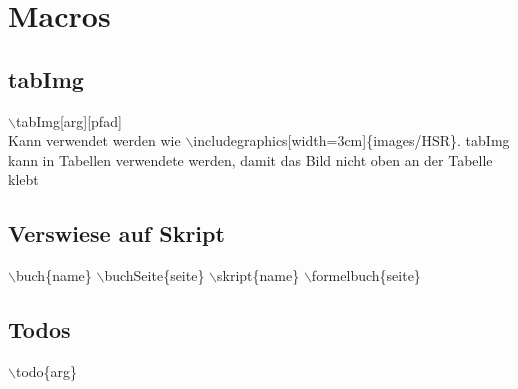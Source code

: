 \section*{Macros}
\subsection{tabImg}
$\backslash$tabImg[arg][pfad]\\
Kann verwendet werden wie $\backslash$includegraphics[width=3cm]\{images/HSR\}.\newline
tabImg kann in Tabellen verwendete werden, damit das Bild nicht oben an der Tabelle klebt

\subsection{Verswiese auf Skript}
$\backslash$buch\{name\} \hspace{1cm} \newline
$\backslash$buchSeite\{seite\} \hspace{1cm}\newline
$\backslash$skript\{name\} \hspace{1cm} \newline
$\backslash$formelbuch\{seite\} \hspace{1cm} \newline

\subsection{Todos}
$\backslash$todo\{arg\} \hspace{1cm} 
